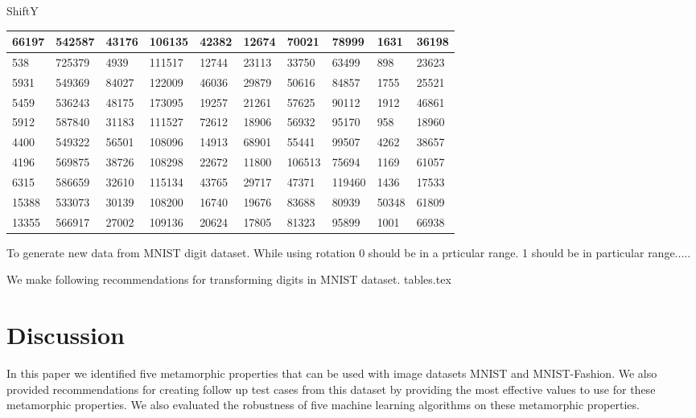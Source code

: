 ShiftY
\begin{table}
\begin{tabular}{|l|l|l|l|l|l|l|l|l|l|}
\hline
66197 & 542587 & 43176 & 106135 & 42382 & 12674 & 70021 & 78999 & 1631 & 36198 \\ \hline
538 & 725379 & 4939 & 111517 & 12744 & 23113 & 33750 & 63499 & 898 & 23623 \\ \hline
5931 & 549369 & 84027 & 122009 & 46036 & 29879 & 50616 & 84857 & 1755 & 25521 \\ \hline
5459 & 536243 & 48175 & 173095 & 19257 & 21261 & 57625 & 90112 & 1912 & 46861 \\ \hline
5912 & 587840 & 31183 & 111527 & 72612 & 18906 & 56932 & 95170 & 958 & 18960 \\ \hline
4400 & 549322 & 56501 & 108096 & 14913 & 68901 & 55441 & 99507 & 4262 & 38657 \\ \hline
4196 & 569875 & 38726 & 108298 & 22672 & 11800 & 106513 & 75694 & 1169 & 61057 \\ \hline
6315 & 586659 & 32610 & 115134 & 43765 & 29717 & 47371 & 119460 & 1436 & 17533 \\ \hline
15388 & 533073 & 30139 & 108200 & 16740 & 19676 & 83688 & 80939 & 50348 & 61809 \\ \hline
13355 & 566917 & 27002 & 109136 & 20624 & 17805 & 81323 & 95899 & 1001 & 66938 \\ \hline
\end{tabular}
\end{table}     

\fi

\clearpage

To generate new data from MNIST digit dataset. While using rotation 0 should be in a prticular range. 1 should be in particular range.....


We make following recommendations for transforming digits in MNIST dataset.
{tables.tex}

\newpage
\section{Discussion}
In this paper we identified five metamorphic properties that can be used with image datasets MNIST and MNIST-Fashion. We also provided recommendations for creating follow up test cases from this dataset by providing the most effective values to use for these metamorphic properties. We also evaluated the robustness of five machine learning algorithms on these metamorphic properties.
